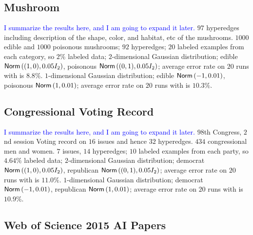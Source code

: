 \documentclass[letterpaper]{article} %
\begin{document}
\subsection{Mushroom}
\textcolor{blue}{I summarize the results here, and I am going to expand it later.}
$97$ hyperedges including description of the shape, color, and habitat, etc of the mushrooms. 
$1000$ edible and $1000$ poisonous mushrooms; 
$92$ hyperedges;
$20$ labeled examples from each category, so $2\%$ labeled data;
$2$-dimensional Gaussian distribution; edible $\mathsf{Norm}\left((1, 0), 0.05I_2\right)$, poisonous $\mathsf{Norm}\left((0, 1), 0.05I_2\right)$; average error rate on $20$ runs with is $8.8\%$.
$1$-dimensional Gaussian distribution; edible $\mathsf{Norm}\left(-1, 0.01\right)$, poisonous $\mathsf{Norm}\left(1, 0.01\right)$; average error rate on $20$ runs with is $10.3\%$.


\subsection{Congressional Voting Record}
\textcolor{blue}{I summarize the results here, and I am going to expand it later.}
$98$th Congress, $2$nd session
Voting record on $16$ issues and hence $32$ hyperedges.
$434$ congressional men and women. $7$ issues, $14$ hyperedges;
$10$ labeled examples from each party, so $4.64\%$ labeled data;
$2$-dimensional Gaussian distribution; democrat $\mathsf{Norm}\left((1, 0), 0.05I_2\right)$, republican $\mathsf{Norm}\left((0, 1), 0.05I_2\right)$; average error rate on $20$ runs with is $11.0\%$.
$1$-dimensional Gaussian distribution; democrat $\mathsf{Norm}\left(-1, 0.01\right)$, republican $\mathsf{Norm}\left(1, 0.01\right)$; average error rate on $20$ runs with is $10.9\%$.

\subsection{Web of Science 2015 AI Papers}

	
\end{document}
